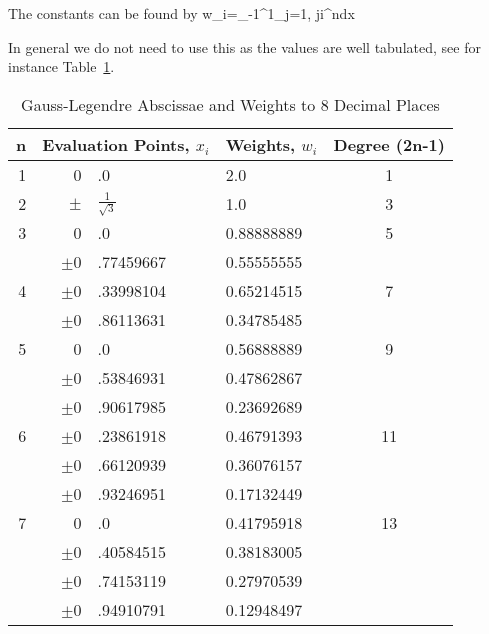 The constants can be found by
\beqn
w_{i}=\int_{-1}^{1}\prod_{j=1, j\ne i}^{n}dx
\eeqn

In general we do not need to use this as the values are well tabulated, see for instance Table~\ref{t-gauss-quad}.


\begin{table}

  \centering
  \caption{Gauss-Legendre Abscissae and Weights to 8 Decimal Places}\label{t-gauss-quad}

\begin{tabular}{rr@{}llc}
n  & \multicolumn{2}{c}{Evaluation Points, $x_i$} & Weights, $w_i$ & Degree (2n-1) \\ \hline
1  & 0&.0                                         & 2.0            & 1 \\ \hline
2  & $\pm$&$\frac{1}{\sqrt{3}}$                   & 1.0            & 3 \\ \hline
3  & 0&.0                                         & 0.88888889     & 5 \\
   & $\pm$0&.77459667                             & 0.55555555     &   \\ \hline
4  & $\pm$0&.33998104                             & 0.65214515     & 7 \\
   & $\pm$0&.86113631                             & 0.34785485     &   \\ \hline
5  & 0&.0                                         & 0.56888889     & 9 \\
   & $\pm$0&.53846931                             & 0.47862867     &   \\
   & $\pm$0&.90617985                             & 0.23692689     &   \\ \hline
6  & $\pm$0&.23861918                             & 0.46791393     & 11 \\
   & $\pm$0&.66120939                             & 0.36076157     &   \\
   & $\pm$0&.93246951                             & 0.17132449     &   \\ \hline
7  & 0&.0                                         & 0.41795918     & 13 \\
   & $\pm$0&.40584515                             & 0.38183005     & \\
   & $\pm$0&.74153119                             & 0.27970539     & \\
   & $\pm$0&.94910791                             & 0.12948497     & \\ \hline

\end{tabular}
\end{table}
